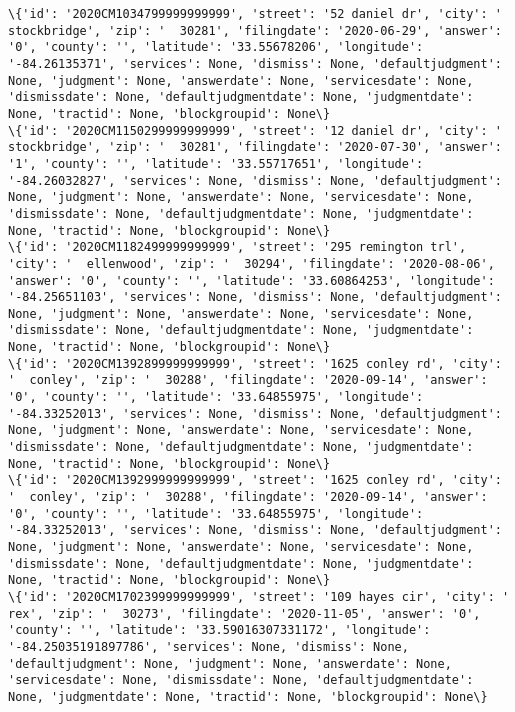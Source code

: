 \documentclass[11pt]{article}
\begin{document}
\begin{Verbatim}[commandchars=\\\{\}]
\{'id': '2020CM1034799999999999', 'street': '52 daniel dr', 'city': '  stockbridge', 'zip': '  30281', 'filingdate': '2020-06-29', 'answer': '0', 'county': '', 'latitude': '33.55678206', 'longitude': '-84.26135371', 'services': None, 'dismiss': None, 'defaultjudgment': None, 'judgment': None, 'answerdate': None, 'servicesdate': None, 'dismissdate': None, 'defaultjudgmentdate': None, 'judgmentdate': None, 'tractid': None, 'blockgroupid': None\}
\{'id': '2020CM1150299999999999', 'street': '12 daniel dr', 'city': '  stockbridge', 'zip': '  30281', 'filingdate': '2020-07-30', 'answer': '1', 'county': '', 'latitude': '33.55717651', 'longitude': '-84.26032827', 'services': None, 'dismiss': None, 'defaultjudgment': None, 'judgment': None, 'answerdate': None, 'servicesdate': None, 'dismissdate': None, 'defaultjudgmentdate': None, 'judgmentdate': None, 'tractid': None, 'blockgroupid': None\}
\{'id': '2020CM1182499999999999', 'street': '295 remington trl', 'city': '  ellenwood', 'zip': '  30294', 'filingdate': '2020-08-06', 'answer': '0', 'county': '', 'latitude': '33.60864253', 'longitude': '-84.25651103', 'services': None, 'dismiss': None, 'defaultjudgment': None, 'judgment': None, 'answerdate': None, 'servicesdate': None, 'dismissdate': None, 'defaultjudgmentdate': None, 'judgmentdate': None, 'tractid': None, 'blockgroupid': None\}
\{'id': '2020CM1392899999999999', 'street': '1625 conley rd', 'city': '  conley', 'zip': '  30288', 'filingdate': '2020-09-14', 'answer': '0', 'county': '', 'latitude': '33.64855975', 'longitude': '-84.33252013', 'services': None, 'dismiss': None, 'defaultjudgment': None, 'judgment': None, 'answerdate': None, 'servicesdate': None, 'dismissdate': None, 'defaultjudgmentdate': None, 'judgmentdate': None, 'tractid': None, 'blockgroupid': None\}
\{'id': '2020CM1392999999999999', 'street': '1625 conley rd', 'city': '  conley', 'zip': '  30288', 'filingdate': '2020-09-14', 'answer': '0', 'county': '', 'latitude': '33.64855975', 'longitude': '-84.33252013', 'services': None, 'dismiss': None, 'defaultjudgment': None, 'judgment': None, 'answerdate': None, 'servicesdate': None, 'dismissdate': None, 'defaultjudgmentdate': None, 'judgmentdate': None, 'tractid': None, 'blockgroupid': None\}
\{'id': '2020CM1702399999999999', 'street': '109 hayes cir', 'city': '  rex', 'zip': '  30273', 'filingdate': '2020-11-05', 'answer': '0', 'county': '', 'latitude': '33.59016307331172', 'longitude': '-84.25035191897786', 'services': None, 'dismiss': None, 'defaultjudgment': None, 'judgment': None, 'answerdate': None, 'servicesdate': None, 'dismissdate': None, 'defaultjudgmentdate': None, 'judgmentdate': None, 'tractid': None, 'blockgroupid': None\}

\end{Verbatim}
\end{document}
